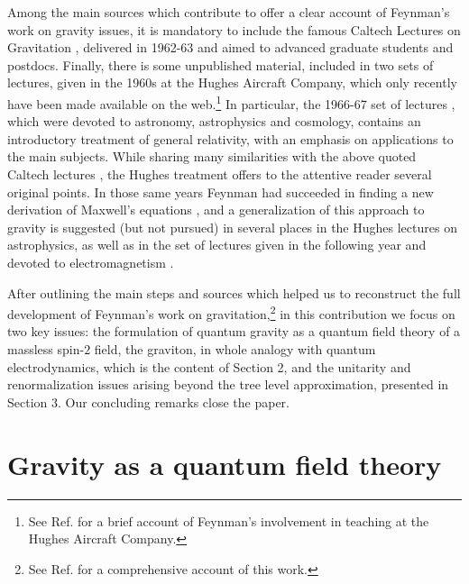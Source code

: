 \documentclass{ws-procs961x669}            %
\begin{document}
Among the main sources which contribute to offer a clear account
of Feynman's work on gravity issues, it is mandatory to include
the famous Caltech Lectures on Gravitation \cite{Feynman:1996kb},
delivered in 1962-63 and aimed to advanced graduate students and
postdocs. Finally, there is some unpublished material, included in
two sets of lectures, given in the 1960s at the Hughes Aircraft
Company, which only recently have been made available on the
web.\footnote{See Ref.  for a brief account of
Feynman's involvement in teaching at the Hughes Aircraft Company.}
In particular, the 1966-67 set of lectures \cite{FeynmanHughes1},
which were devoted to astronomy, astrophysics and cosmology,
contains an introductory treatment of general relativity, with an
emphasis on applications to the main subjects. While sharing many
similarities with the above quoted Caltech lectures
\cite{Feynman:1996kb}, the Hughes treatment offers to the
attentive reader several original points. In those same years
Feynman had succeeded in finding a new derivation of Maxwell's
equations \cite{DeLuca:2019ija,DiMauro:2020bpd}, and a
generalization of this approach to gravity is suggested (but not
pursued) in several places in the Hughes lectures on astrophysics,
as well as in the set of lectures given in the following year and
devoted to electromagnetism \cite{FeynmanHughes2}.

After outlining the main steps and sources which helped us to
reconstruct the full development of Feynman's work on
gravitation,\footnote{See Ref.  for a comprehensive
account of this work.} in this contribution we focus on two key
issues: the formulation of quantum gravity as a quantum field
theory of a massless spin-$2$ field, the graviton, in whole
analogy with quantum electrodynamics, which is the content of
Section 2, and the unitarity and renormalization issues arising
beyond the tree level approximation, presented in Section 3. Our
concluding remarks close the paper.


\section{Gravity as a quantum field theory}
\end{document}
